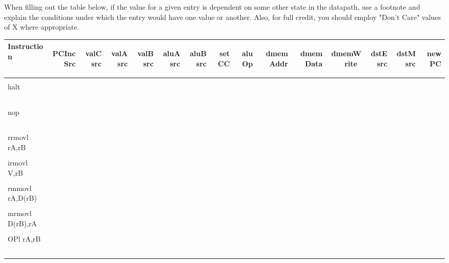 \documentclass[11pt]{article}
\newcommand{\rot}[1]{\begin{sideways}{\bf {#1}}\end{sideways}}
\newcommand{\blank}{\ \ \ \ \ }
\begin{document}
When filling out the table below, if the value for a given entry is dependent on some other state in the datapath, use a footnote and explain the conditions under which the entry would have one value or another.  Also, for full credit, you should employ "Don't Care" values of X where appropriate.
\begin{center}
\begin{tabular}{|l|r|r|r|r|r|r|r|r|r|r|r|r|r|r|}
\hline
{\bf Instruction} & \rot{PCIncSrc} & \rot{valCsrc} & \rot{valAsrc} & \rot{valBsrc}  & \rot{aluAsrc} & \rot{aluBsrc} & \rot{setCC} & \rot{aluOp} & \rot{dmemAddr} & \rot{dmemData} & \rot{dmemWrite\ } & \rot{dstEsrc} & \rot{dstMsrc} & \rot{newPC} \\
\hline \hline
& & & & & & & & & & & & & & \\
halt & \blank & \blank & \blank & \blank & \blank & \blank & \blank & \blank & \blank & \blank & \blank & \blank & \blank & \blank  \\
\hline
& & & & & & & & & & & & & & \\
nop & \blank & \blank & \blank & \blank & \blank & \blank & \blank & \blank & \blank & \blank & \blank & \blank & \blank & \blank  \\
\hline
& & & & & & & & & & & & & & \\
rrmovl rA,rB & \blank & \blank & \blank & \blank & \blank & \blank & \blank & \blank & \blank & \blank & \blank & \blank & \blank & \blank  \\
\hline
& & & & & & & & & & & & & & \\
irmovl V,rB & \blank & \blank & \blank & \blank & \blank & \blank & \blank & \blank & \blank & \blank & \blank & \blank & \blank & \blank  \\
\hline
& & & & & & & & & & & & & & \\
rmmovl rA,D(rB) & \blank & \blank & \blank & \blank & \blank & \blank & \blank & \blank & \blank & \blank & \blank & \blank & \blank & \blank  \\
\hline
& & & & & & & & & & & & & & \\
mrmovl D(rB),rA & \blank & \blank & \blank & \blank & \blank & \blank & \blank & \blank & \blank & \blank & \blank & \blank & \blank & \blank  \\
\hline
& & & & & & & & & & & & & & \\
OPl rA,rB & \blank & \blank & \blank & \blank & \blank & \blank & \blank & \blank & \blank & \blank & \blank & \blank & \blank & \blank  \\
\hline
& & & & & & & & & & & & & & \\

\end{tabular}
\end{center}
\end{document}
